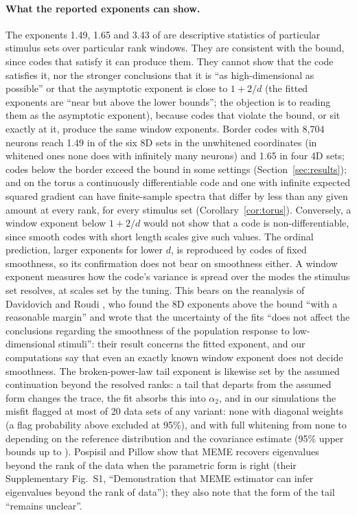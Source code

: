 \paragraph{What the reported exponents can show.} The exponents 1.49, 1.65 and 3.43 of \cite{stringer2019} are descriptive statistics of particular stimulus sets over particular rank windows. They are consistent with the bound, since codes that satisfy it can produce them. They cannot show that the code satisfies it, nor the stronger conclusions that it is ``as high-dimensional as possible'' or that the asymptotic exponent is close to $1 + 2/d$ (the fitted exponents are ``near but above the lower bounds''; the objection is to reading them as the asymptotic exponent), because codes that violate the bound, or sit exactly at it, produce the same window exponents. Border codes with 8,704 neurons reach 1.49 in \FinReachEight{} of the six 8D sets in the unwhitened coordinates (in whitened ones none does with infinitely many neurons) and 1.65 in \FinReachAllFour{} four 4D sets; codes below the border exceed the bound in some settings (Section~\ref{sec:results}); and on the torus a continuously differentiable code and one with infinite expected squared gradient can have finite-sample spectra that differ by less than any given amount at every rank, for every stimulus set (Corollary~\ref{cor:torus}). Conversely, a window exponent below $1 + 2/d$ would not show that a code is non-differentiable, since smooth codes with short length scales give such values. The ordinal prediction, larger exponents for lower $d$, is reproduced by codes of fixed smoothness, so its confirmation does not bear on smoothness either. A window exponent measures how the code's variance is spread over the modes the stimulus set resolves, at scales set by the tuning. This bears on the reanalysis of Davidovich and Roudi \cite{dr2022}, who found the 8D exponents above the bound ``with a reasonable margin'' and wrote that the uncertainty of the fits ``does not affect the conclusions regarding the smoothness of the population response to low-dimensional stimuli'': their result concerns the fitted exponent, and our computations say that even an exactly known window exponent does not decide smoothness. The broken-power-law tail exponent is likewise set by the assumed continuation beyond the resolved ranks: a tail that departs from the assumed form changes the trace, the fit absorbs this into $\alpha_2$, and in our simulations the misfit flagged at most \MemeFlagMaxN{} of 20 data sets of any variant: none with diagonal weights (a flag probability above \MemeFlagZeroHi{} excluded at 95\%), and with full whitening from none to \MemeFlagMaxN{} depending on the reference distribution and the covariance estimate (95\% upper bounds up to \MemeFlagMaxHi{}). Pospisil and Pillow show that MEME recovers eigenvalues beyond the rank of the data when the parametric form is right (their Supplementary Fig.~S1, ``Demonstration that MEME estimator can infer eigenvalues beyond the rank of data''); they also note that the form of the tail ``remains unclear''.

